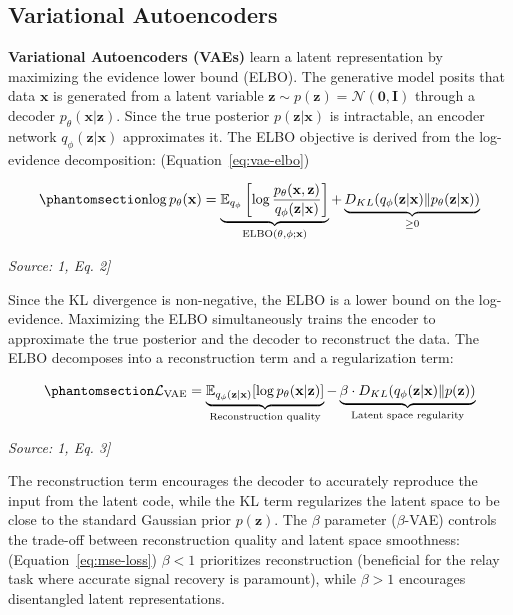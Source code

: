 \subsection{Variational Autoencoders}\label{sec:variational-autoencoders}

\textbf{Variational Autoencoders (VAEs)} \cite{KingmaWelling2014VAE} learn a latent representation by maximizing the evidence lower bound (ELBO). The generative model posits that data \(\mathbf{x}\) is generated from a latent variable \(\mathbf{z} \sim p(\mathbf{z}) = \mathcal{N}(\mathbf{0}, \mathbf{I})\) through a decoder \(p_\theta(\mathbf{x} | \mathbf{z})\). Since the true posterior \(p(\mathbf{z} | \mathbf{x})\) is intractable, an encoder network \(q_\phi(\mathbf{z} | \mathbf{x})\) approximates it. The ELBO objective is derived from the log-evidence decomposition: (Equation~\ref{eq:vae-elbo})

\begin{equation}\protect\phantomsection\label{eq:vae-elbo}{\log p_\theta(\mathbf{x}) = \underbrace{\mathbb{E}_{q_\phi}\left[\log \frac{p_\theta(\mathbf{x}, \mathbf{z})}{q_\phi(\mathbf{z} | \mathbf{x})}\right]}_{\text{ELBO}(\theta, \phi; \mathbf{x})} + \underbrace{D_{KL}(q_\phi(\mathbf{z} | \mathbf{x}) \| p_\theta(\mathbf{z} | \mathbf{x}))}_{\geq 0}
}\end{equation} \par{\small\textit{Source: \cite{Laneman2004CooperativeDiversity}1, Eq. 2]}}

Since the KL divergence is non-negative, the ELBO is a lower bound on the log-evidence. Maximizing the ELBO simultaneously trains the encoder to approximate the true posterior and the decoder to reconstruct the data. The ELBO decomposes into a reconstruction term and a regularization term:

\begin{equation}\protect\phantomsection\label{eq:vae-loss}{\mathcal{L}_{\text{VAE}} = \underbrace{\mathbb{E}_{q_\phi(\mathbf{z}|\mathbf{x})}[\log p_\theta(\mathbf{x}|\mathbf{z})]}_{\text{Reconstruction quality}} - \underbrace{\beta \cdot D_{KL}(q_\phi(\mathbf{z}|\mathbf{x}) \| p(\mathbf{z}))}_{\text{Latent space regularity}}
}\end{equation} \par{\small\textit{Source: \cite{Laneman2004CooperativeDiversity}1, Eq. 3]}}

The reconstruction term encourages the decoder to accurately reproduce the input from the latent code, while the KL term regularizes the latent space to be close to the standard Gaussian prior \(p(\mathbf{z})\). The \(\beta\) parameter (\(\beta\)-VAE) \cite{Higgins2017betaVAE} controls the trade-off between reconstruction quality and latent space smoothness: (Equation~\ref{eq:mse-loss}) \(\beta < 1\) prioritizes reconstruction (beneficial for the relay task where accurate signal recovery is paramount), while \(\beta > 1\) encourages disentangled latent representations.

